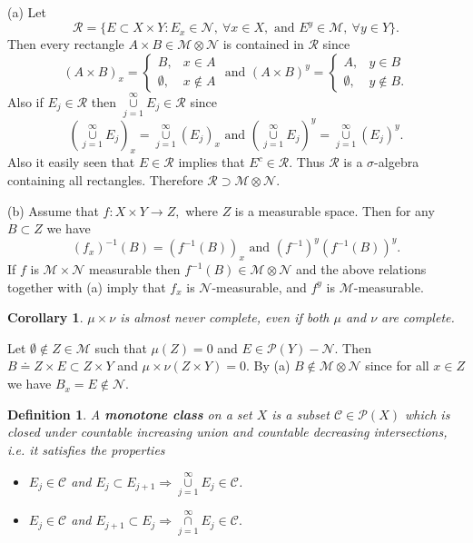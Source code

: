\documentclass[12pt]{report}
\newtheorem{corollary}[theorem]{Corollary}
\newtheorem{definition}[theorem]{Definition}
\begin{document}
\medskip
{}  (a)  Let
\[
\mathcal{R} = \{E \subset X \times Y: E_x \in \mathcal{N}, \ \forall x \in X,
\mbox{ and } E^y \in \mathcal{M}, \ \forall y \in Y\}.
\] Then every rectangle $A \times B \in \mathcal{M} \otimes
\mathcal{N}$ is contained in $\mathcal{R} $ since
\[ (A \times B)_x = \left \{ \begin{array}{ll} B, &x \in A\\
\emptyset, &x \notin A \end{array} \right . \mbox{ and } (A \times B)^y
= \left
\{ \begin{array}{ll} A, &y \in B\\
\emptyset, &y \notin B.\end{array}\right .
\] Also if $E_j \in \mathcal{R}$ then
$\overset{\infty}{\underset{j=1}{\cup}} E_j \in
\mathcal{R}$ since 
\[
\left ( \overset{\infty}{\underset{j=1}{\cup}}E_j\right )_x =
\overset{\infty}{\underset{j=1}{\cup}} (E_j)_x \mbox{ and } \left (
\overset{\infty}{\underset{j=1}{\cup}} E_j \right )^y =
\overset{\infty}{\underset{j=1}{\cup}} (E_j)^y.
\] 
Also it easily seen that   $E\in \mathcal{R}$ implies that
  $E^c\in \mathcal{R}$.
Thus $\mathcal{R}$ is a $\sigma$-algebra containing all rectangles.  
 Therefore
$\mathcal{R}\supset \mathcal{M} \otimes \mathcal{N}$.

\noindent (b)
  Assume that $f: X \times Y \longrightarrow Z,$ where $Z$ is a
measurable space.  Then for any $B \subset Z$ we have
\[ (f_x)^{-1} (B) = (f^{-1} (B))_x \mbox{ and } (f^{-1})^y (f^{-1} (B))^y.
\] If $f$ is $\mathcal{M} \times \mathcal{N}$ measurable then $f^{-1}(B)
\in
\mathcal{M} \otimes \mathcal{N}$ and the above relations together with
(a) imply that $f_x$ is $\mathcal{N}$-measurable, and $f^y$ is
$\mathcal{M}$-measurable.

\begin{corollary} $\mu \times \nu$  is almost never complete, even if
both $\mu$ and $\nu$ are complete.
\end{corollary}

  Let $\emptyset \notin Z \in \mathcal{M}$ such
that
$\mu(Z) = 0$ and $E \in \mathcal{P} (Y) - \mathcal{N}$.  Then $B
\doteq Z \times E \subset Z
\times Y$ and $\mu \times \nu(Z \times Y) = 0$. 
 By (a) $B \notin \mathcal{M}
\otimes \mathcal{N}$ since for all $x \in Z$ we have $B_x = E \notin
\mathcal{N}$.


\begin{definition}  A \textbf{monotone class} on a set $X$ is a subset
$\mathcal{C} \in\mathcal{P} (X)$ which is closed  under countable increasing 
union and countable decreasing intersections, i.e. it satisfies the properties
\begin{itemize}
\item[a.] $E_j \in \mathcal{C}$ and $E_j \subset E_{j+1} \Longrightarrow
\overset{\infty}{\underset{j=1}{\cup}} E_j \in \mathcal{C}$.
\item[b.] $E_j \in \mathcal{C} $ and $E_{j+1} \subset E_j \Longrightarrow
\overset{\infty}{\underset{j=1}{\cap}} E_j \in \mathcal{C}.$
\end{itemize}
\end{definition}
\end{document}
